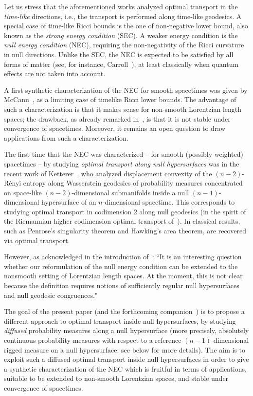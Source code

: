 \documentclass[12pt,a4paper]{amsart}
\theoremstyle{plain}
\theoremstyle{definition}
\numberwithin{equation}{section}
\begin{document}
Let us stress that the aforementioned works analyzed optimal transport in the \emph{time-like} directions, i.e.,  the transport is performed along time-like geodesics.  A special case of time-like Ricci bounds is the one of non-negative lower bound, also known as the \emph{strong energy condition} (SEC). A weaker energy condition is the \emph{null energy condition} (NEC), requiring the non-negativity of the Ricci curvature in null directions. Unlike the SEC, the NEC is expected to be satisfied by all forms of matter (see, for instance, Carroll~\cite[Ch.~4.6]{Carroll}), at least classically when quantum effects are not taken into account.


A first synthetic characterization of the NEC for smooth spacetimes was given by McCann~\cite{McCann-NEC}, as a limiting case of timelike Ricci lower bounds.  The advantage of such a characterization is that it makes sense for non-smooth Lorentzian length spaces; the drawback, as already remarked in~\cite{McCann-NEC},  is that it is not stable under convergence of spacetimes. Moreover, it remains an open question to draw applications from such a characterization.  

The first time that the NEC was characterized -- for smooth (possibly weighted) spacetimes -- by studying \emph{optimal transport along null hypersurfaces} was in the recent work of Ketterer~\cite{Ket24}, who  analyzed displacement convexity of the $(n-2)$-R\'enyi entropy along Wasserstein geodesics of probability measures concentrated on  space-like $(n-2)$-dimensional submanifolds inside a null $(n-1)$-dimensional hypersurface of an $n$-dimensional spacetime. This corresponds to studying optimal transport in codimension 2 along null geodesics (in the spirit of the Riemannian higher codimension optimal transport of~\cite{KettererMondino}). In \cite{Ket24} classical results, such as Penrose's singularity theorem and Hawking's area theorem, are  recovered via optimal transport.

However, as acknowledged in the introduction of~\cite{Ket24}: ``It is an interesting
question whether our reformulation of the null energy condition can be extended to the
nonsmooth setting of Lorentzian length spaces. At the moment, this is not clear because the
definition requires notions of sufficiently regular null hypersurfaces and null geodesic
congruences."



The goal of the present paper (and the forthcoming companion~\cite{CMM24b}) is to propose a different approach to optimal transport inside null hypersurfaces, by studying \emph{diffused} probability measures along a null hypersurface (more precisely, absolutely continuous probability measures with respect to a reference $(n-1)$-dimensional rigged measure on a null hypersurface; see below for more details). The aim is to    exploit such a diffused optimal transport inside null hypersurfaces in order to give a synthetic characterization of the NEC which is fruitful in terms of applications,  suitable to be extended to non-smooth Lorentzian spaces, and stable under convergence of spacetimes.
\end{document}
